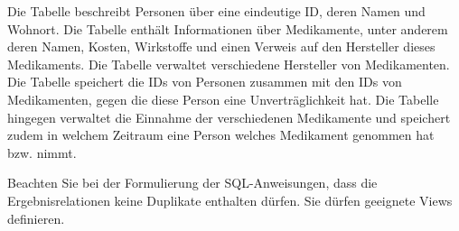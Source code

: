 \documentclass{lehramt-informatik-aufgabe}
\begin{document}
Die Tabelle  beschreibt Personen über eine eindeutige ID,
deren Namen und Wohnort. Die Tabelle  enthält
Informationen über Medikamente, unter anderem deren Namen, Kosten,
Wirkstoffe und einen Verweis auf den Hersteller dieses Medikaments. Die
Tabelle  verwaltet verschiedene Hersteller von
Medikamenten. Die Tabelle  speichert
die IDs von Personen zusammen mit den IDs von Medikamenten, gegen die
diese Person eine Unverträglichkeit hat. Die Tabelle  hingegen
verwaltet die Einnahme der verschiedenen Medikamente und speichert zudem
in welchem Zeitraum eine Person welches Medikament genommen hat bzw.
nimmt.

Beachten Sie bei der Formulierung der SQL-Anweisungen, dass die
Ergebnisrelationen keine Duplikate enthalten dürfen. Sie dürfen
geeignete Views definieren.
\end{document}
